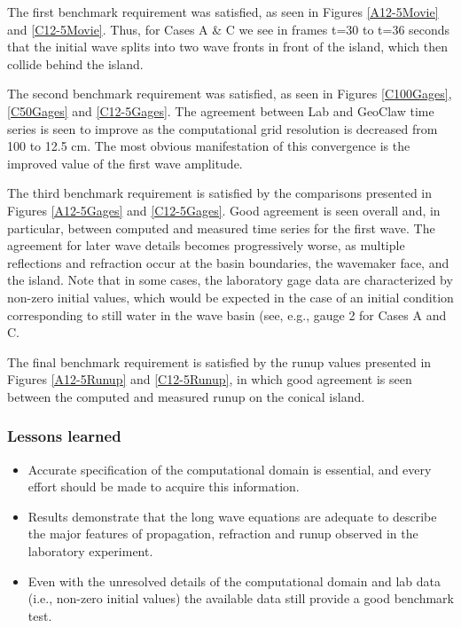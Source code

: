   The first benchmark requirement was satisfied, as seen in Figures \ref{A12-5Movie} and \ref{C12-5Movie}.  Thus, for Cases A \& C we see in frames t=30 to t=36 seconds that the initial wave splits into two wave fronts in front of the island, which then collide behind the island. 


  The second benchmark requirement was satisfied, as seen in Figures \ref{C100Gages}, \ref{C50Gages} and \ref{C12-5Gages}.  The agreement between Lab and GeoClaw time series is seen to improve as the computational grid resolution is decreased from 100 to 12.5 cm.  The most obvious manifestation of this convergence is the improved value of the first wave amplitude.

  The third benchmark requirement is satisfied by the comparisons presented in Figures \ref{A12-5Gages} and \ref{C12-5Gages}.  Good agreement is seen overall and, in particular, between computed and measured time series for the first wave.  The agreement for later wave details becomes progressively worse, as multiple reflections and refraction occur at the basin boundaries, the wavemaker face, and the island.  Note that in some cases, the laboratory gage data are characterized by non-zero initial values, which would be expected in the case of an initial condition corresponding to still water in the wave basin (see, e.g., gauge 2 for Cases A and C. 

  The final benchmark requirement is satisfied by the runup values presented in Figures \ref{A12-5Runup} and \ref{C12-5Runup}, in which good agreement is seen between the computed and measured runup on the conical island.

\subsubsection{Lessons learned}

\begin{itemize}
\item Accurate specification of the computational domain is essential, and every effort should be made to acquire this information.
\item Results demonstrate that the long wave equations are adequate to describe the major features of propagation, refraction and runup observed in the laboratory experiment.
\item Even with the unresolved details of the computational domain and lab data (i.e., non-zero initial values) the available data still provide a good benchmark test.
\end{itemize}


